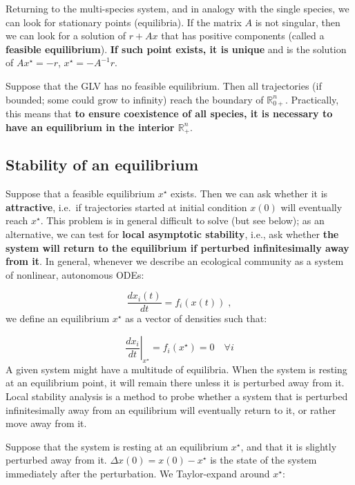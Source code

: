 \documentclass[]{book}
\begin{document}
Returning to the multi-species system, and in analogy with the single species, we can look for stationary points (equilibria). If the matrix \(A\) is not singular, then we can look for a solution of \(r + Ax\) that has positive components (called a \textbf{feasible equilibrium}). \textbf{If such point exists, it is unique} and is the solution of \(Ax^\star = -r\), \(x^\star = -A^{-1}r\).

Suppose that the GLV has no feasible equilibrium. Then all trajectories (if bounded; some could grow to infinity) reach the boundary of \(\mathbb R^n_{0+}\). Practically, this means that \textbf{to ensure coexistence of all species, it is necessary to have an equilibrium in the interior \(\mathbb R^n_{+}\)}.

\hypertarget{stability-of-an-equilibrium}{%
\subsection{Stability of an equilibrium}\label{stability-of-an-equilibrium}}

Suppose that a feasible equilibrium \(x^\star\) exists. Then we can ask whether it is \textbf{attractive}, i.e.~if trajectories started at initial condition \(x(0)\) will eventually reach \(x^\star\). This problem is in general difficult to solve (but see below); as an alternative, we can test for \textbf{local asymptotic stability}, i.e., ask whether \textbf{the system will return to the equilibrium if perturbed infinitesimally away from it}. In general, whenever we describe an ecological community as a system of nonlinear, autonomous ODEs:

\[
\frac{d x_i (t)}{d t} = f_i (x(t)) \;,
\]
we define an equilibrium \(x^\star\) as a vector of densities such that:

\[
\left. \frac{d x_i}{d t} \right|_{{x}^\star} = f_i
({x}^\star) = 0 \quad \forall i
\]
A given system might have a multitude of equilibria. When the system is resting at an equilibrium point, it will remain there unless it is perturbed away from it. Local stability analysis is a method to probe whether a system that is perturbed infinitesimally away from an equilibrium will eventually return to it, or rather move away from it.

Suppose that the system is resting at an equilibrium \(x^\star\), and that it is slightly perturbed away from it. \(\Delta x(0) = x(0)-x^\star\) is the state of the system immediately after the perturbation. We Taylor-expand around \(x^\star\):
\end{document}
